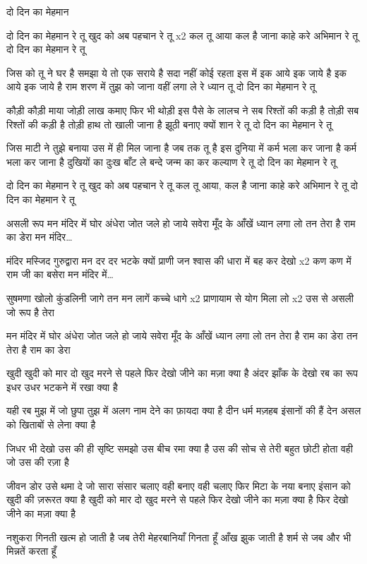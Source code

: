 दो दिन का मेहमान

दो दिन का मेहमान रे तू
खुद को अब पहचान रे तू x2
कल तू आया कल है जाना
काहे करे अभिमान रे तू
दो दिन का मेहमान रे तू

जिस को तू ने घर है समझा
ये तो एक सराये है
सदा नहीं कोई रहता इस में
इक आये इक जाये है
इक आये इक जाये है
राम शरण में तुझ को जाना
वहीं लगा ले रे ध्यान तू
दो दिन का मेहमान रे तू

कौड़ी कौड़ी माया जोड़ी
लाख कमाए फिर भी थोड़ी
इस पैसे के लालच ने
सब रिश्तों की कड़ी है तोड़ी
सब रिश्तों की कड़ी है तोड़ी
हाथ तो खाली जाना है
झूठी बनाए क्यों शान रे तू
दो दिन का मेहमान रे तू

जिस माटी ने तुझे बनाया
उस में ही मिल जाना है
जब तक तू है इस दुनिया में
कर्म भला कर जाना है
कर्म भला कर जाना है
दुखियों का दुःख बाँट ले बन्दे
जन्म का कर कल्याण रे तू
दो दिन का मेहमान रे तू

दो दिन का मेहमान रे तू
खुद को अब पहचान रे तू
कल तू आया, कल है जाना
काहे करे अभिमान रे तू
दो दिन का मेहमान रे तू

असली रूप
मन मंदिर में घोर अंधेरा
जोत जले हो जाये सवेरा
मूँद के आँखें ध्यान लगा लो
तन तेरा है राम का डेरा
मन मंदिर…

मंदिर मस्जिद गुरुद्वारा मन
दर दर भटके क्यों प्राणी जन
श्वास की धारा में बह कर देखो x2
कण कण में राम जी का बसेरा
मन मंदिर में…

सुषमणा खोलो कुंडलिनी जागे
तन मन लागें कच्चे धागे x2
प्राणायाम से योग मिला लो x2
उस से असली जो रूप है तेरा

मन मंदिर में घोर अंधेरा
जोत जले हो जाये सवेरा
मूँद के आँखें ध्यान लगा लो
तन तेरा है राम का डेरा
तन तेरा है राम का डेरा





खुदी
खुदी को मार दो खुद मरने से पहले
फिर देखो जीने का मज़ा क्या है
अंदर झाँक के देखो रब का रूप
इधर उधर भटकने में रखा क्या है

यही रब मुझ में जो छुपा तुझ में
अलग नाम देने का फ़ायदा क्या है
दीन धर्म मज़हब इंसानों की हैं देन
असल को खिताबों से लेना क्या है

जिधर भी देखो उस की ही सृष्टि
समझो उस बीच रमा क्या है
उस की सोच से तेरी बहुत छोटी
होता वही जो उस की रज़ा है

जीवन डोर उसे थमा दे जो सारा संसार
चलाए
वही बनाए वही चलाए फिर मिटा के नया
बनाए
इंसान को खुदी की ज़रूरत क्या है
खुदी को मार दो खुद मरने से पहले
फिर देखो जीने का मज़ा क्या है
फिर देखो जीने का मज़ा क्या है

नशुकरा
गिनती खत्म हो जाती है
जब तेरी मेहरबानियाँ गिनता हूँ 
आँख झुक जाती है शर्म से
जब और भी मिन्नतें करता हूँ 

